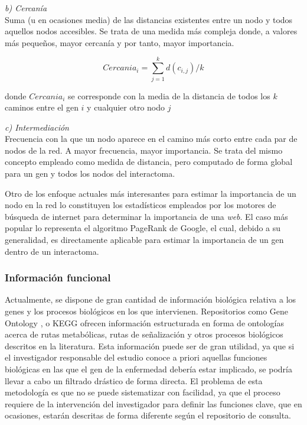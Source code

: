 \bigskip
\textit{b) Cercanía}\\

Suma (u en ocasiones media) de las distancias existentes entre un nodo y todos aquellos nodos accesibles. Se trata de una medida más compleja donde, a valores más pequeños, mayor cercanía y por tanto, mayor importancia.

\begin{equation}
Cercania_i = \sum_{j=1}^{k} d(c_{i,j}) / k
\end{equation}

donde $Cercania_i$ se corresponde con la media de la distancia de todos los $k$ caminos entre el gen $i$ y cualquier otro nodo $j$

\bigskip
\textit{c) Intermediación}\\

Frecuencia con la que un nodo aparece en el camino más corto entre cada par de nodos de la red. A mayor frecuencia, mayor importancia. Se trata del mismo concepto empleado como medida de distancia, pero computado de forma global para un gen y todos los nodos del interactoma.

\medskip
Otro de los enfoque actuales más interesantes para estimar la importancia de un nodo en la red lo constituyen los estadísticos empleados por los motores de búsqueda de internet para determinar la importancia de una \textit{web}.  El caso más popular lo representa el algoritmo PageRank de Google, el cual, debido a su generalidad, es directamente aplicable para estimar la importancia de un gen dentro de un interactoma. 

  
  \subsubsection{Información funcional}

Actualmente, se dispone de gran cantidad de información biológica relativa a los genes y los procesos biológicos en los que intervienen. Repositorios como Gene Ontology \cite{go}, o KEGG \cite{kegg} ofrecen información estructurada en forma de ontologías acerca de rutas metabólicas, rutas de señalización y otros procesos biológicos descritos en la literatura. Esta información puede ser de gran utilidad, ya que si el investigador responsable del estudio conoce a priori aquellas funciones biológicas en las que el gen de la enfermedad debería estar implicado, se podría llevar a cabo un filtrado drástico de forma directa.  El problema de esta metodología es que no se puede sistematizar con facilidad, ya que el proceso requiere de la intervención del investigador para definir las funciones clave, que en ocasiones, estarán descritas de forma diferente según el repositorio de consulta.


